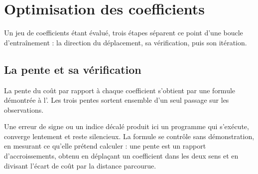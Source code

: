 \chapter{Optimisation des coefficients}
\label{ch:entrainer}


Un jeu de coefficients étant évalué, trois étapes séparent ce point d'une boucle
d'entraînement : la direction du déplacement, sa vérification, puis son
itération.

\section{La pente et sa vérification}

La pente du coût par rapport à chaque coefficient s'obtient par une formule
démontrée à l'. Les trois pentes sortent ensemble d'un
seul passage sur les observations.

Une erreur de signe ou un indice décalé produit ici un programme qui s'exécute,
converge lentement et reste silencieux. La formule se contrôle sans
démonstration, en mesurant ce qu'elle prétend calculer : une pente est un rapport
d'accroissements, obtenu en déplaçant un coefficient dans les deux sens et en
divisant l'écart de coût par la distance parcourue.


